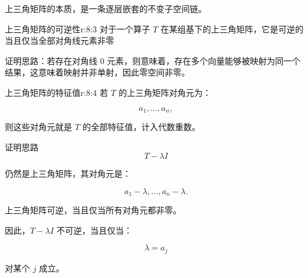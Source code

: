 \begin{jinsight}
上三角矩阵的本质，是一条逐层嵌套的不变子空间链。
\end{jinsight}

\begin{jprop}{上三角矩阵的可逆性}{r:8:3}
对于一个算子 $T$ 在某组基下的上三角矩阵，它是可逆的当且仅当全部对角线元素非零

证明思路：若存在对角线 $0$ 元素，则意味着，存在多个向量能够被映射为同一个结果，这意味着映射并非单射，因此零空间非零。
\end{jprop}

\begin{jprop}{上三角矩阵的特征值}{r:8:4}
若 $T$ 的上三角矩阵对角元为：

\[
a_1,\ldots,a_n,
\]

则这些对角元就是 $T$ 的全部特征值，计入代数重数。
\end{jprop}

\begin{jproof}{证明思路}
\[
T-\lambda I
\]

仍然是上三角矩阵，其对角元是：

\[
a_1-\lambda,\ldots,a_n-\lambda.
\]

上三角矩阵可逆，当且仅当所有对角元都非零。

因此，$T-\lambda I$ 不可逆，当且仅当：

\[
\lambda=a_j
\]

对某个 $j$ 成立。
\end{jproof}
